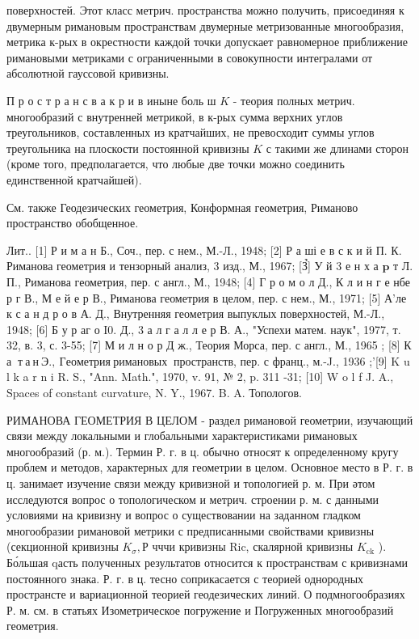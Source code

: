 \documentclass[10pt]{article}
\begin{document}
поверхностей. Этот класс метрич. пространства можно получить, присоединяя к двумерным римановым пространствам двумерные метризованные многообразия, метрика к-рых в окрестности каждой точки допускает равномерное приближение римановыми метриками с ограниченными в совокупности интегралами от абсолютной гауссовой кривизны.



П р о с т р а н с в а к р и в иныне боль ш $K$ - теория полных метрич. многообразий с внутренней метрикой, в к-рых сумма верхних углов треугольников, составленных из кратчайших, не превосходит суммы углов треугольника на плоскости постоянной кривизны $K$ с такими же длинами сторон (кроме того, предполагается, что любые две точки можно соединить единственной кратчайшей).



См. также Геодезических геометрия, Конформная геометрия, Риманово пространство обобщенное.



Лит.. [1] Р и м а н Б., Соч., пер. с нем., М.-Л., 1948; [2] Р а ші е в с к и й П. К. Риманова геометрия и тензорный анализ, 3 изд., М., 1967; [З̉] У й 3 е н х а $\mathbf{p}$ т Л. П., Риманова геометрия, пер. с англ., М., 1948; [4] Г р о м о л Д., К л и н г е нбе р г В., М е й е р В., Риманова геометрия в целом, пер. с нем., М., 1971; [5] А'ле к с а н д р о в А. Д., Внутренняя геометрия выпуклых поверхностей, М.-Л., 1948; [6] Б у р аг о I0. Д., 3 а л г а л л е р В. А., "Успехи матем. наук", 1977, т. 32, в. 3, с. 3-55; [7] М и л н о р Д ж., Теория Морса, пер. с англ., М., 1965 ; [8] К а $\mathbf{~ т ~ а ~ н ~ Э . , ~ Г е о м е т р и я ~ р и м а н о в ы х ~}$ пространств, пер. с франц., м.-J., 1936 ;'[9] K u l k a r n i R. S., "Ann. Math.", 1970, v. 91, № 2, p. 311 -31; [10] W o l f J. A., Spaces of constant curvature, N. Y., 1967. B. A. Топологов.



РИМАНОВА ГЕОМЕТРИЯ В ЦЕЛОМ - раздел римановой геометрии, изучающий связи между локальными и глобальными характеристиками римановых многообразий (р. м.). Термин Р. г. в ц. обычно относят к определенному кругу проблем и методов, характерных для геометрии в целом. Основное место в Р. г. в ц. занимает изучение связи между кривизной и топологией р. м. При әтом исследуются вопрос о топологическом и метрич. строении р. м. с данными условиями на кривизну и вопрос о существовании на заданном гладком многообразии римановой метрики с предписанными свойствами кривизны (секционной кривизны $K_{\sigma}, Р$ чччи кривизны Ric, скалярной кривизны $K_{\mathrm{ck}}$ ). Бо́льшая qасть полученных результатов относится к пространствам с кривизнами постоянного знака. Р. г. в ц. тесно соприкасается с теорией однородных пространсте и вариационной теорией геодезических линий. О подмногообразиях Р. м. см. в статьях Изометрическое погружение и Погруженных многообразий геометрия.
\end{document}
